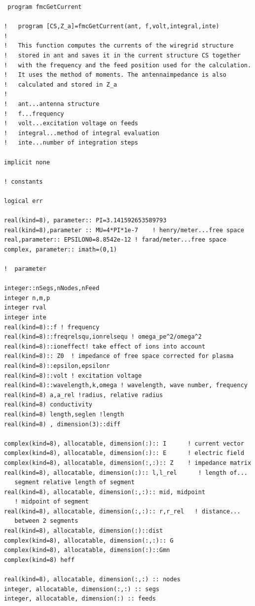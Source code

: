 \documentclass[a4paper,11pt]{thesis}
\begin{document}
\small
\begin{verbatim}
 program fmcGetCurrent

!   program [CS,Z_a]=fmcGetCurrent(ant, f,volt,integral,inte)
!
!   This function computes the currents of the wiregrid structure
!   stored in ant and saves it in the current structure CS together
!   with the frequency and the feed position used for the calculation.
!   It uses the method of moments. The antennaimpedance is also
!   calculated and stored in Z_a
!
!   ant...antenna structure
!   f...frequency
!   volt...excitation voltage on feeds
!   integral...method of integral evaluation
!   inte...number of integration steps

implicit none

! constants

logical err

real(kind=8), parameter:: PI=3.141592653589793
real(kind=8),parameter :: MU=4*PI*1e-7    ! henry/meter...free space
real,parameter:: EPSILON0=8.8542e-12 ! farad/meter...free space
complex, parameter:: imath=(0,1)

!  parameter

integer::nSegs,nNodes,nFeed
integer n,m,p
integer rval
integer inte
real(kind=8)::f ! frequency
real(kind=8)::freqrelsqu,ionrelsequ ! omega_pe^2/omega^2
real(kind=8)::ioneffect! take effect of ions into account
real(kind=8):: Z0  ! impedance of free space corrected for plasma
real(kind=8)::epsilon,epsilonr
real(kind=8)::volt ! excitation voltage
real(kind=8)::wavelength,k,omega ! wavelength, wave number, frequency
real(kind=8) a,a_rel !radius, relative radius
real(kind=8) conductivity
real(kind=8) length,seglen !length
real(kind=8) , dimension(3)::diff

complex(kind=8), allocatable, dimension(:):: I      ! current vector
complex(kind=8), allocatable, dimension(:):: E      ! electric field
complex(kind=8), allocatable, dimension(:,:):: Z    ! impedance matrix
real(kind=8), allocatable, dimension(:):: l,l_rel      ! length of...
   segment relative length of segment
real(kind=8), allocatable, dimension(:,:):: mid, midpoint
   ! midpoint of segment
real(kind=8), allocatable, dimension(:,:):: r,r_rel   ! distance...
   between 2 segments
real(kind=8), allocatable, dimension(:)::dist
complex(kind=8), allocatable, dimension(:,:):: G
complex(kind=8), allocatable, dimension(:)::Gmn
complex(kind=8) heff

real(kind=8), allocatable, dimension(:,:) :: nodes
integer, allocatable, dimension(:,:) :: segs
integer, allocatable, dimension(:) :: feeds


\end{verbatim}
\end{document}
